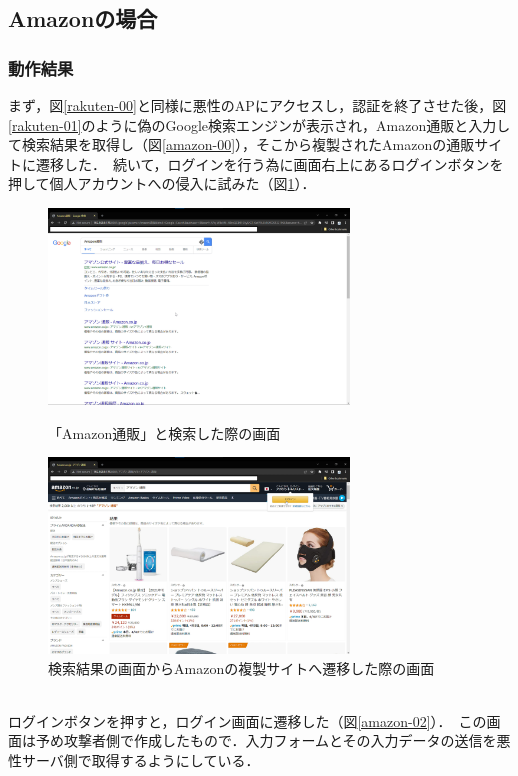\documentclass[dvipdfmx,twocolumn]{jsarticle}
\begin{document}
        \subsection{Amazonの場合}
            \subsubsection{動作結果}
                まず，図\ref{rakuten-00}と同様に悪性のAPにアクセスし，認証を終了させた後，図\ref{rakuten-01}のように偽のGoogle検索エンジンが表示され，Amazon通販と入力して検索結果を取得し（図\ref{amazon-00}），そこから複製されたAmazonの通販サイトに遷移した．\
                続いて，ログインを行う為に画面右上にあるログインボタンを押して個人アカウントへの侵入に試みた（図\ref{amazon-01}）．\
                \begin{figure}[h]
                    \centering
                    \includegraphics[width=8cm]{img/amazon/amazon-00.png}
                    \caption{「Amazon通販」と検索した際の画面}
                    \label{amazon-00}
                    \includegraphics[width=8cm]{img/amazon/amazon-01.png}
                    \caption{検索結果の画面からAmazonの複製サイトへ遷移した際の画面}
                    \label{amazon-01}
                \end{figure}
                \\
                ログインボタンを押すと，ログイン画面に遷移した（図\ref{amazon-02}）．\
                この画面は予め攻撃者側で作成したもので．入力フォームとその入力データの送信を悪性サーバ側で取得するようにしている．\
\end{document}

